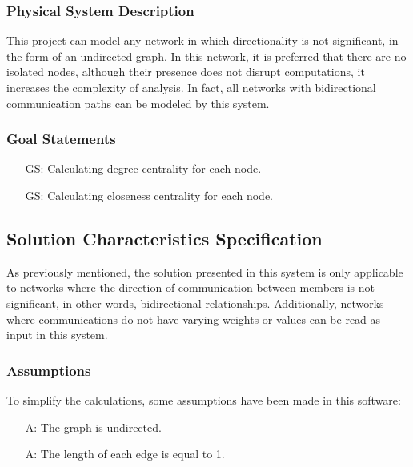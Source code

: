 \documentclass[12pt]{article}
\newcounter{assumpnum} %
\newcounter{goalnum} %
\begin{document}
\subsubsection{Physical System Description} \label{sec_phySystDescrip}

This project can model any network in which directionality is not significant, in the form of an undirected graph. In this network, it is preferred that there are no isolated nodes, although their presence does not disrupt computations, it increases the complexity of analysis. In fact, all networks with bidirectional communication paths can be modeled by this system.


\subsubsection{Goal Statements}


\begin{itemize}

\item[GS\refstepcounter{goalnum}\thegoalnum \label{g_degree}:] 
Calculating degree centrality for each node.
\item[GS\refstepcounter{goalnum}\thegoalnum \label{g_closeness}:]
Calculating closeness centrality for each node.

\end{itemize}

\subsection{Solution Characteristics Specification}

As previously mentioned, the solution presented in this system is only applicable to networks where the direction of communication between members is not significant, in other words, bidirectional relationships. Additionally, networks where communications do not have varying weights or values can be read as input in this system.

\subsubsection{Assumptions} \label{sec_assumpt}

To simplify the calculations, some assumptions have been made in this software:

\begin{itemize}

\item[A\refstepcounter{assumpnum}\theassumpnum \label{A_directed}:]
The graph is undirected.

\item[A\refstepcounter{assumpnum}\theassumpnum \label{A_weighted}:]
The length of each edge is equal to 1.
\end{itemize}
\end{document}
